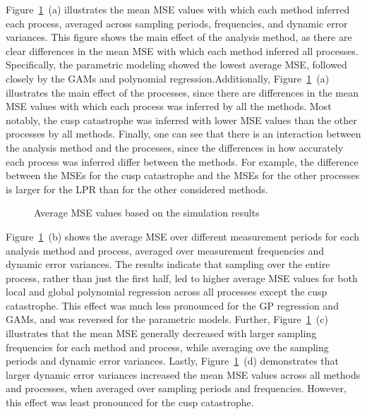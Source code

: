 \documentclass[man, floatsintext]{apa7}
\begin{document}
Figure~\ref{fig:mean_results_mse}~(a) illustrates the mean MSE values with
which each method inferred each process, averaged across sampling periods,
frequencies, and dynamic error variances. This figure shows the main effect of
the analysis method, as there are clear differences in the mean MSE with which
each method inferred all processes. Specifically, the parametric modeling
showed the lowest average MSE, followed closely by the GAMs and polynomial
regression.Additionally, Figure~\ref{fig:mean_results_mse}~(a) illustrates the
main effect of the processes, since there are differences in the mean MSE
values with which each process was inferred by all the methods. Most notably,
the cusp catastrophe was inferred with lower MSE values than the other
processes by all methods. Finally, one can see that there is an interaction
between the analysis method and the processes, since the differences in how
accurately each process was inferred differ between the methods. For example,
the difference between the MSEs for the cusp catastrophe and the MSEs for the
other processes is larger for the LPR than for the other considered methods.

\begin{figure}[!t]
  \caption{Average MSE values based on the simulation results}
  \label{fig:mean_results_mse}
\end{figure}

Figure~\ref{fig:mean_results_mse}~(b) shows the average MSE over different
measurement periods for each analysis method and process, averaged over
measurement frequencies and dynamic error variances. The results indicate that
sampling over the entire process, rather than just the first half, led to
higher average MSE values for both local and global polynomial regression
across all processes except the cusp catastrophe. This effect was much less
pronounced for the GP regression and GAMs, and was reversed for the parametric
models. Further, Figure~\ref{fig:mean_results_mse}~(c) illustrates that the
mean MSE generally decreased with larger sampling frequencies for each method
and process, while averaging ove the sampling periods and dynamic error
variances. Lastly, Figure~\ref{fig:mean_results_mse}~(d) demonstrates that
larger dynamic error variances increased the mean MSE values across all methods
and processes, when averaged over sampling periods and frequencies. However,
this effect was least pronounced for the cusp catastrophe.
\end{document}
